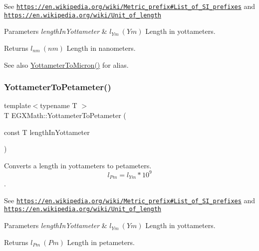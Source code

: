 See \href{https://en.wikipedia.org/wiki/Metric_prefix#List_of_SI_prefixes}{\tt https\+://en.\+wikipedia.\+org/wiki/\+Metric\+\_\+prefix\#\+List\+\_\+of\+\_\+\+S\+I\+\_\+prefixes} and \href{https://en.wikipedia.org/wiki/Unit_of_length}{\tt https\+://en.\+wikipedia.\+org/wiki/\+Unit\+\_\+of\+\_\+length} 
\begin{DoxyParams}{Parameters}
{\em length\+In\+Yottameter} & $ l_{Ym}\ (Ym)$ Length in yottameters. \\
\hline
\end{DoxyParams}
\begin{DoxyReturn}{Returns}
$ l_{nm}\ (nm)$ Length in nanometers. 
\end{DoxyReturn}
\begin{DoxySeeAlso}{See also}
\mbox{\hyperlink{group___e_g_x_math-_conversions-_length_conversions-_yottameter-_non-_s_i_gaad96d515763b1dfbcd968020e1b97de4}{Yottameter\+To\+Micron()}} for alias. 
\end{DoxySeeAlso}
\mbox{\label{group___e_g_x_math-_conversions-_length_conversions-_yottameter-_s_i_gaf4b5d397ea5debc0bd5195ad3a5c23d5}} 
\subsubsection{\texorpdfstring{Yottameter\+To\+Petameter()}{YottameterToPetameter()}}
{\footnotesize\ttfamily template$<$typename T $>$ \\
T E\+G\+X\+Math\+::\+Yottameter\+To\+Petameter (\begin{DoxyParamCaption}\item[{const T}]{length\+In\+Yottameter }\end{DoxyParamCaption})}



Converts a length in yottameters to petameters. \[ l_{Pm}=l_{Ym} * 10^{9} \]. 

See \href{https://en.wikipedia.org/wiki/Metric_prefix#List_of_SI_prefixes}{\tt https\+://en.\+wikipedia.\+org/wiki/\+Metric\+\_\+prefix\#\+List\+\_\+of\+\_\+\+S\+I\+\_\+prefixes} and \href{https://en.wikipedia.org/wiki/Unit_of_length}{\tt https\+://en.\+wikipedia.\+org/wiki/\+Unit\+\_\+of\+\_\+length} 
\begin{DoxyParams}{Parameters}
{\em length\+In\+Yottameter} & $ l_{Ym}\ (Ym)$ Length in yottameters. \\
\hline
\end{DoxyParams}
\begin{DoxyReturn}{Returns}
$ l_{Pm}\ (Pm)$ Length in petameters. 
\end{DoxyReturn}
\mbox{\label{group___e_g_x_math-_conversions-_length_conversions-_yottameter-_s_i_ga7af9d1314de06921546f079641c033b2}} 
